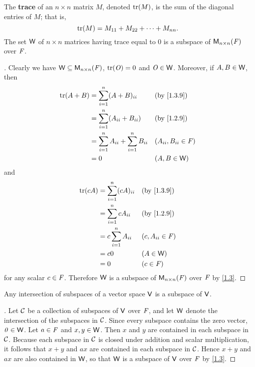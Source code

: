 \begin{eg}\label{1.3.9}
  The \textbf{trace} of an \(n \times n\) matrix \(M\), denoted \(\tr[M]\), is the sum of the diagonal entries of \(M\);
  that is,
  \[
    \tr[M] = M_{1 1} + M_{2 2} + \dots + M_{n n}.
  \]
  The set \(\mathsf{W}\) of \(n \times n\) matrices having trace equal to \(0\) is a subspace of \(\mathsf{M}_{{n} \times n}({\mathit{F}})\) over \(\mathit{F}\).
\end{eg}

\begin{proof}[]
  Clearly we have \(\mathsf{W} \subseteq \mathsf{M}_{{n} \times n}({\mathit{F}})\), \(\tr[\zm] = 0\) and \(\mathit{O} \in \mathsf{W}\).
  Moreover, if \(A, B \in \mathsf{W}\), then
  \begin{align*}
    \tr[A + B] & = \sum_{i = 1}^n (A + B)_{i i}                    &  & \text{(by \cref{1.3.9})}  \\
               & = \sum_{i = 1}^n (A_{i i} + B_{i i})              &  & \text{(by \cref{1.2.9})}  \\
               & = \sum_{i = 1}^n A_{i i} + \sum_{i = 1}^n B_{i i} &  & (A_{i i}, B_{i i} \in \F) \\
               & = 0                                               &  & (A, B \in \W)
  \end{align*}
  and
  \begin{align*}
    \tr[cA] & = \sum_{i = 1}^n (cA)_{i i} &  & \text{(by \cref{1.3.9})} \\
            & = \sum_{i = 1}^n cA_{i i}   &  & \text{(by \cref{1.2.9})} \\
            & = c \sum_{i = 1}^n A_{i i}  &  & (c, A_{i i} \in \F)      \\
            & = c0                        &  & (A \in \W)               \\
            & = 0                         &  & (c \in \F)
  \end{align*}
  for any scalar \(c \in \mathit{F}\).
  Therefore \(\mathsf{W}\) is a subspace of \(\mathsf{M}_{{n} \times n}({\mathit{F}})\) over \(\mathit{F}\) by \cref{1.3}.
\end{proof}

\begin{thm}\label{1.4}
  Any intersection of subspaces of a vector space \(\mathsf{V}\) is a subspace of \(\mathsf{V}\).
\end{thm}

\begin{proof}[]
  Let \(\mathcal{C}\) be a collection of subspaces of \(\mathsf{V}\) over \(\mathit{F}\), and let \(\mathsf{W}\) denote the intersection of the subspaces in \(\mathcal{C}\).
  Since every subspace contains the zero vector, \(\mathit{0} \in \mathsf{W}\).
  Let \(a \in \mathit{F}\) and \(x, y \in \mathsf{W}\).
  Then \(x\) and \(y\) are contained in each subspace in \(\mathcal{C}\).
  Because each subspace in \(\mathcal{C}\) is closed under addition and scalar multiplication, it follows that \(x + y\) and \(ax\) are contained in each subspace in \(\mathcal{C}\).
  Hence \(x + y\) and \(ax\) are also contained in \(\mathsf{W}\), so that \(\mathsf{W}\) is a subspace of \(\mathsf{V}\) over \(\mathit{F}\) by \cref{1.3}.
\end{proof}

